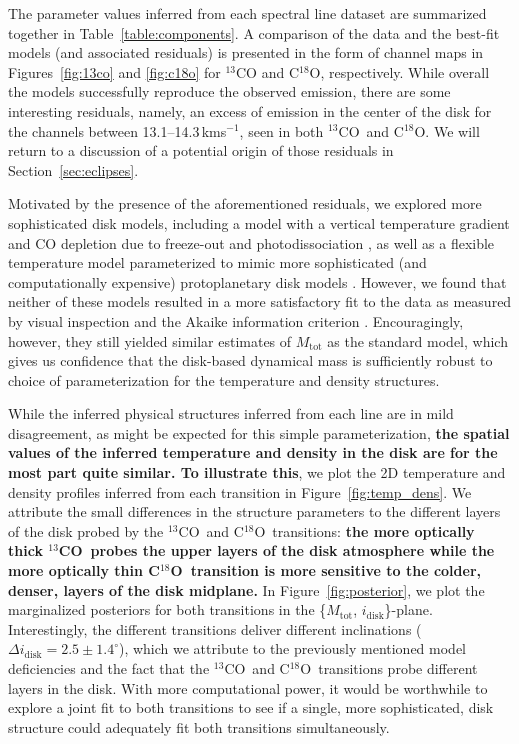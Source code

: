 \documentclass[twocolumn]{aastex61}
\newcommand\kms{\ifmmode{\rm km\thinspace s^{-1}}\else km\thinspace s$^{-1}$\fi}
\newcommand{\thirteen}{${}^{13}$CO}
\newcommand{\eighteen}{C${}^{18}$O}
\begin{document}
The parameter values inferred from each spectral line dataset are summarized together in Table~\ref{table:components}.  A comparison of the data and the best-fit models (and associated residuals) is presented in the form of channel maps in Figures~\ref{fig:13co} and \ref{fig:c18o} for $^{13}$CO and C$^{18}$O, respectively.  While overall the models successfully reproduce the observed emission, there are some interesting residuals, namely, an excess of emission in the center of the disk for the channels between 13.1--14.3\,\kms, seen in both \thirteen\ and \eighteen. We will return to a discussion of a potential origin of those residuals in Section~\ref{sec:eclipses}.

Motivated by the presence of the aforementioned residuals, we explored more sophisticated disk models, including a model with a vertical temperature gradient and CO depletion due to freeze-out and photodissociation \citep[after][]{rosenfeld13a}, as well as a flexible temperature model parameterized to mimic more sophisticated (and computationally expensive) protoplanetary disk models \citep{kamp04,jonkheid04}. However, we found that neither of these models resulted in a more satisfactory fit to the data as measured by visual inspection and the Akaike information criterion \citep[AIC;][]{akaike73}. Encouragingly, however, they still yielded similar estimates of $M_\mathrm{tot}$ as the standard model, which gives us confidence that the disk-based dynamical mass is sufficiently robust to choice of parameterization for the temperature and density structures.

While the inferred physical structures inferred from each line are in mild disagreement, as might be expected for this simple parameterization, \textbf{the spatial values of the inferred temperature and density in the disk are for the most part quite similar. To illustrate this}, we plot the 2D temperature and density profiles inferred from each transition in Figure~\ref{fig:temp_dens}. We attribute the small differences in the structure parameters to the different layers of the disk probed by the \thirteen\ and \eighteen\ transitions: \textbf{the more optically thick \thirteen\ probes the upper layers of the disk atmosphere while the more optically thin \eighteen\ transition is more sensitive to the colder, denser, layers of the disk midplane.} In Figure~\ref{fig:posterior}, we plot the marginalized posteriors for both transitions in the \{$M_\mathrm{tot}$, $i_\mathrm{disk}$\}-plane. Interestingly, the different transitions deliver different inclinations ($\Delta i_\mathrm{disk} = 2.5 \pm 1.4^\circ$), which we attribute to the previously mentioned model deficiencies and the fact that the \thirteen\ and \eighteen\ transitions probe different layers in the disk. With more computational power, it would be worthwhile to explore a joint fit to both transitions to see if a single, more sophisticated, disk structure could adequately fit both transitions simultaneously.
\end{document}
